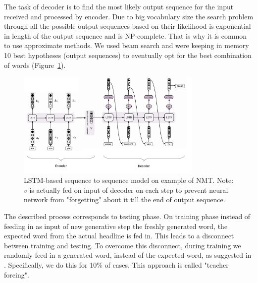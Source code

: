 The task of decoder is to find the most likely output sequence for the input received and processed by encoder. Due to big vocabulary size the search problem through all the possible output sequences based on their likelihood is exponential in length of the output sequence and is NP-complete. That is why it is common to use approximate methods. We used beam search and were keeping in memory 10 best hypotheses (output sequences) to eventually opt for the best combination of words (Figure~\ref{fig:encoder-decoder-lstm}). 

\begin{figure}[h]
\centering
	\includegraphics[width=0.8\textwidth]{img/seq2seq-detailed.png}
	\caption{\label{fig:encoder-decoder-lstm}LSTM-based sequence to sequence model on example of NMT. Note: $v$ is actually fed on input of decoder on each step to prevent neural network from "forgetting" about it till the end of output sequence. }
\end{figure}


The described process corresponds to testing phase. On training phase instead of feeding in as input of new generative step the freshly generated word, the expected word from the actual headline is fed in. This leads to a disconnect between training and testing. To overcome this disconnect, during training we randomly feed in a generated word, instead of the expected word, as suggested in \cite{scheduled_sampling}. Specifically, we do this for 10\% of cases. This approach is called "teacher forcing".

%	


